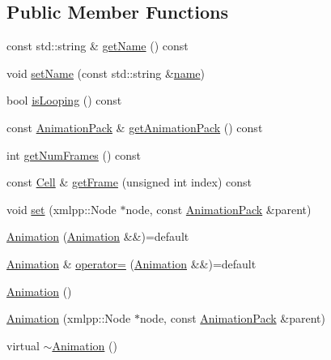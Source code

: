 \subsection*{Public Member Functions}
\begin{DoxyCompactItemize}
\item 
const std\+::string \& \hyperlink{classZeta_1_1Animation_a697aa8eb070668cec1f2e4d7b25df597}{get\+Name} () const 
\item 
void \hyperlink{classZeta_1_1Animation_a30ad50fa2e22482dcbaf3502376cc490}{set\+Name} (const std\+::string \&\hyperlink{classZeta_1_1Animation_ac532add4feb3dd5e33f722a8142aedd6}{name})
\item 
bool \hyperlink{classZeta_1_1Animation_aa57126967823aa208c75d84460caef3c}{is\+Looping} () const 
\item 
const \hyperlink{classZeta_1_1AnimationPack}{Animation\+Pack} \& \hyperlink{classZeta_1_1Animation_a076b235101d9accb1c700354a5d338a9}{get\+Animation\+Pack} () const 
\item 
int \hyperlink{classZeta_1_1Animation_a9db1e0875105a9ac926ffd6073c1e06c}{get\+Num\+Frames} () const 
\item 
const \hyperlink{classZeta_1_1Cell}{Cell} \& \hyperlink{classZeta_1_1Animation_abea6f68c17959f92e7c2ed184c1a8ba8}{get\+Frame} (unsigned int index) const 
\item 
void \hyperlink{classZeta_1_1Animation_a6c141b127a9d83d17959259dcb07c48b}{set} (xmlpp\+::\+Node $\ast$node, const \hyperlink{classZeta_1_1AnimationPack}{Animation\+Pack} \&parent)
\item 
\hyperlink{classZeta_1_1Animation_adb107c29b84109e5e6df6debc953acea}{Animation} (\hyperlink{classZeta_1_1Animation}{Animation} \&\&)=default
\item 
\hyperlink{classZeta_1_1Animation}{Animation} \& \hyperlink{classZeta_1_1Animation_a464caf337fc48417e1d0157cb8f98200}{operator=} (\hyperlink{classZeta_1_1Animation}{Animation} \&\&)=default
\item 
\hyperlink{classZeta_1_1Animation_a89a1e45fbeb6582448bcf878e1b20be7}{Animation} ()
\item 
\hyperlink{classZeta_1_1Animation_a7591b35b9b593b1f22316af9d1f081fb}{Animation} (xmlpp\+::\+Node $\ast$node, const \hyperlink{classZeta_1_1AnimationPack}{Animation\+Pack} \&parent)
\item 
virtual \hyperlink{classZeta_1_1Animation_a43a5f796d416cf2e8c3f5cd8153e4277}{$\sim$\+Animation} ()
\end{DoxyCompactItemize}
